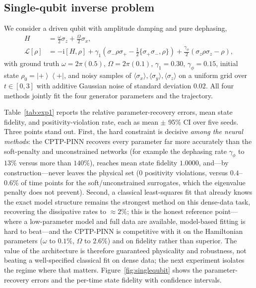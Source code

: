\documentclass[11pt]{article}
\newcommand{\calL}{\mathcal{L}}
\newcommand{\ii}{\mathrm{i}}
\newcommand{\ket}[1]{\left\lvert #1 \right\rangle}
\newcommand{\bra}[1]{\left\langle #1 \right\rvert}
\begin{document}
\subsection{Single-qubit inverse problem}
\label{sec:experiment_qubit}

We consider a driven qubit with amplitude damping and pure dephasing,
\begin{align}
    H &= \tfrac{\omega}{2}\sigma_z+\tfrac{\Omega}{2}\sigma_x,\\
    \calL[\rho] &= -\ii[H,\rho]+\gamma_1\!\left(\sigma_-\rho\sigma_+-\tfrac12\{\sigma_+\sigma_-,\rho\}\right)+\tfrac{\gamma_\phi}{2}\!\left(\sigma_z\rho\sigma_z-\rho\right),
\end{align}
with ground truth $\omega=2\pi(0.5)$, $\Omega=2\pi(0.1)$, $\gamma_1=0.30$, $\gamma_\phi=0.15$, initial state $\rho_0=\ket{+}\bra{+}$, and noisy samples of $\langle\sigma_x\rangle,\langle\sigma_y\rangle,\langle\sigma_z\rangle$ on a uniform grid over $t\in[0,3]$ with additive Gaussian noise of standard deviation $0.02$. All four methods jointly fit the four generator parameters and the trajectory.

Table~\ref{tab:exp1} reports the relative parameter-recovery errors, mean state fidelity, and positivity-violation rate, each as mean $\pm$ 95\% CI over five seeds. Three points stand out. First, the hard constraint is decisive \emph{among the neural methods}: the CPTP-PINN recovers every parameter far more accurately than the soft-penalty and unconstrained networks (for example the dephasing rate $\gamma_\phi$ to $13\%$ versus more than $140\%$), reaches mean state fidelity $1.0000$, and---by construction---never leaves the physical set ($0$ positivity violations, versus $0.4$--$0.6\%$ of time points for the soft/unconstrained surrogates, which the eigenvalue penalty does not prevent). Second, a classical least-squares fit that already knows the exact model structure remains the strongest method on this dense-data task, recovering the dissipative rates to $\approx2\%$; this is the honest reference point---where a low-parameter model and full data are available, model-based fitting is hard to beat---and the CPTP-PINN is competitive with it on the Hamiltonian parameters ($\omega$ to $0.1\%$, $\Omega$ to $2.6\%$) and on fidelity rather than superior. The value of the architecture is therefore guaranteed physicality and robustness, not beating a well-specified classical fit on dense data; the next experiment isolates the regime where that matters. Figure~\ref{fig:singlequbit} shows the parameter-recovery errors and the per-time state fidelity with confidence intervals.
\end{document}
